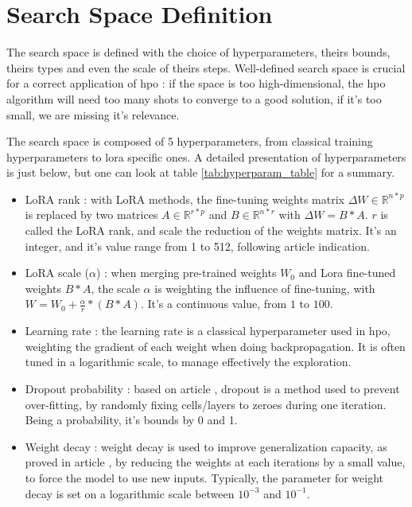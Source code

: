 \section{Search Space Definition}
\label{sec:search_space}

The search space is defined with the choice of hyperparameters, theirs bounds, theirs types and even the scale of theirs steps.  Well-defined search space is crucial for a correct application of \acrshort{hpo} : if the space is too high-dimensional, the \acrshort{hpo} algorithm will need too many shots to converge to a good solution, if it's too small, we are missing it's relevance. 

The search space is composed of 5 hyperparameters, from classical training hyperparameters to \acrshort{lora} specific ones. A detailed presentation of hyperparameters is just below, but one can look at table \ref{tab:hyperparam_table} for a summary.
\begin{itemize}
    \item LoRA rank : with LoRA methods, the fine-tuning weights matrix $\Delta W \in \mathbb{R}^{n*p}$ is replaced by two matrices $A \in \mathbb{R}^{r*p}$ and $B \in \mathbb{R}^{n*r}$ with $\Delta W = B*A$. $r$ is called the LoRA rank, and scale the reduction of the weights matrix. It's an integer, and it's value range from 1 to 512, following article \cite{tribes} indication.
    \item LoRA scale ($\alpha$) : when merging pre-trained weights $W_0$ and Lora fine-tuned weights $B*A$, the scale $\alpha$ is weighting the influence of fine-tuning, with $W = W_0 + \frac{\alpha}{r} * (B*A)$. It's a continuous value, from $1$ to $100$.
    \item Learning rate : the learning rate is a classical hyperparameter used in \acrshort{hpo}, weighting the gradient of each weight when doing backpropagation. It is often tuned in a logarithmic scale, to manage effectively the exploration. 
    \item Dropout probability : based on article \cite{srivastava_dropout_2014}, dropout is a method used to prevent over-fitting, by randomly fixing cells/layers to zeroes during one iteration. Being a probability, it's bounds by 0 and 1.
    \item Weight decay : weight decay is used to improve generalization capacity, as proved in article \cite{krogh_simple_1991}, by reducing the weights at each iterations by a small value, to force the model to use new inputs. Typically, the parameter for weight decay is set on a logarithmic scale between $10^{-3}$ and $10^{-1}$.
\end{itemize}





